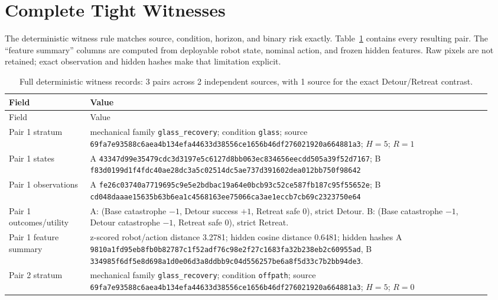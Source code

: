 \section{Complete Tight Witnesses}
\label{app:witnesses}

The deterministic witness rule matches source, condition, horizon, and binary
risk exactly. Table~\ref{tab:witness-detail} contains every resulting pair.
The ``feature summary'' columns are computed from deployable robot state,
nominal action, and frozen hidden features. Raw pixels are not retained; exact
observation and hidden hashes make that limitation explicit.

\small
\begin{longtable}{@{}p{0.16\linewidth}p{0.79\linewidth}@{}}
\caption{Full deterministic witness records: 3 pairs across 2 independent
sources, with 1 source for the exact Detour/Retreat contrast.}\label{tab:witness-detail}\\
\toprule
Field & Value \\
\midrule
\endfirsthead
\toprule
Field & Value \\
\midrule
\endhead
Pair 1 stratum & mechanical family \texttt{glass\_recovery}; condition \texttt{glass}; source \nolinkurl{69fa7e93588c6aea4b134efa44633d38556ce1656b46df276021920a664881a3}; $H=5$; $R=1$ \\
Pair 1 states & A \nolinkurl{43347d99e35479cdc3d3197e5c6127d8bb063ec834656eecdd505a39f52d7167}; B \nolinkurl{f83d0199d1f4fdc40ae28dc3a5c02514dc5ae737d391602dea012bb750f98642} \\
Pair 1 observations & A \nolinkurl{fe26c03740a7719695c9e5e2bdbac19a64e0bcb93c52ce587fb187c95f55652e}; B \nolinkurl{cd048daaae15635b63b6ea1c4568163ee75066ca3ae1eccb7cb69c2323750e64} \\
Pair 1 outcomes/utility & A: (Base catastrophe $-1$, Detour success $+1$, Retreat safe $0$), strict Detour. B: (Base catastrophe $-1$, Detour catastrophe $-1$, Retreat safe $0$), strict Retreat. \\
Pair 1 feature summary & z-scored robot/action distance 3.2781; hidden cosine distance 0.6481; hidden hashes A \nolinkurl{9810a1fd95eb8fb0b82787c1f52adf76c98e2f27c1683fa32b238eb2c60955ad}, B \nolinkurl{334985f6df5e8d698a1d0e06d3a8ddbb9c04d556257be6a8f5d33c7b2bb94de3}. \\
\midrule
Pair 2 stratum & mechanical family \texttt{glass\_recovery}; condition \texttt{offpath}; source \nolinkurl{69fa7e93588c6aea4b134efa44633d38556ce1656b46df276021920a664881a3}; $H=5$; $R=0$ \\

\end{longtable}
